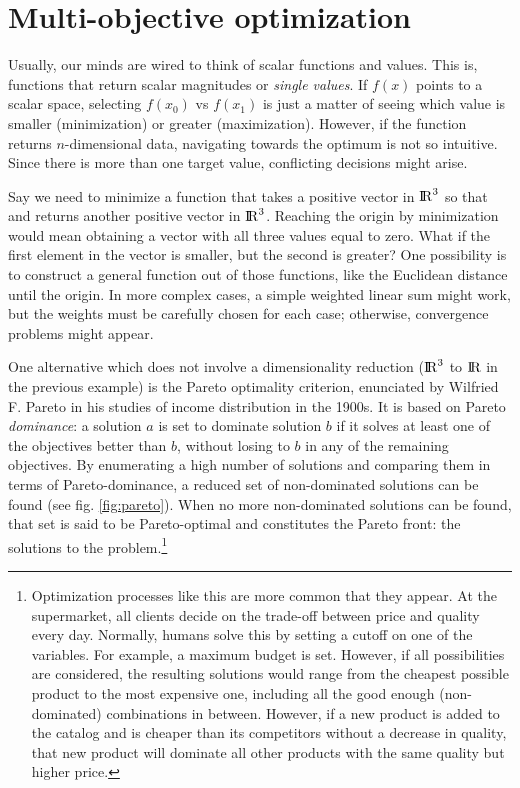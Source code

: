 \section{Multi-objective optimization}
\label{section:multiobjective}

Usually, our minds are wired to think of scalar functions and values. This is, functions that return scalar magnitudes or \textit{single values}. If $f(x)$ points to a scalar space, selecting $f(x_{0})$ vs $f(x_{1})$ is just a matter of seeing which value is smaller (minimization) or greater (maximization). However, if the function returns $n$-dimensional data, navigating towards the optimum is not so intuitive. Since there is more than one target value, conflicting decisions might arise.

Say we need to minimize a function that takes a positive vector in ${\rm I\!R}^{3}$ so that and returns another positive vector in ${\rm I\!R}^{3}$. Reaching the origin by minimization would mean obtaining a vector with all three values equal to zero. What if the first element in the vector is smaller, but the second is greater? One possibility is to construct a general function out of those functions, like the Euclidean distance until the origin. In more complex cases, a simple weighted linear sum might work, but the weights must be carefully chosen for each case; otherwise, convergence problems might appear.\cite{das1997closer}

One alternative which does not involve a dimensionality reduction (${\rm I\!R}^{3}$ to ${\rm I\!R}$ in the previous example) is the Pareto optimality criterion, enunciated by Wilfried F. Pareto in his studies of income distribution in the 1900s. It is based on Pareto \textit{dominance}: a solution $a$ is set to dominate solution $b$ if it solves at least one of the objectives better than $b$, without losing to $b$ in any of the remaining objectives.\cite{deb1999multi} By enumerating a high number of solutions and comparing them in terms of Pareto-dominance, a reduced set of non-dominated solutions can be found (see fig. \ref{fig:pareto}). When no more non-dominated solutions can be found, that set is said to be Pareto-optimal and constitutes the Pareto front: the solutions to the problem.\footnote{Optimization processes like this are more common that they appear. At the supermarket, all clients decide on the trade-off between price and quality every day. Normally, humans solve this by setting a cutoff on one of the variables. For example, a maximum budget is set. However, if all possibilities are considered, the resulting solutions would range from the cheapest possible product to the most expensive one, including all the good enough (non-dominated) combinations in between. However, if a new product is added to the catalog and is cheaper than its competitors without a decrease in quality, that new product will dominate all other products with the same quality but higher price.}

